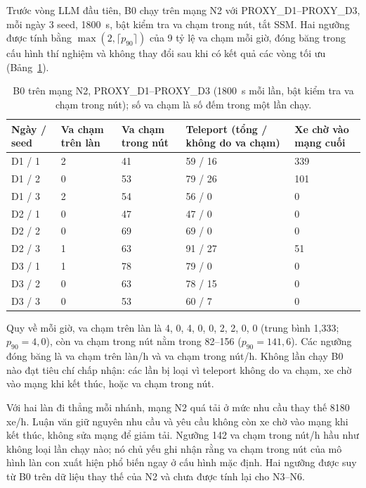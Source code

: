 \documentclass[../main.tex]{subfiles}
\begin{document}
Trước vòng LLM đầu tiên, B0 chạy trên mạng N2 với PROXY\_D1--PROXY\_D3, mỗi ngày 3 seed, 1800~s, bật kiểm tra va chạm trong nút, tắt SSM. Hai ngưỡng được tính bằng $\max(2, \lceil p_{90} \rceil)$ của 9 tỷ lệ va chạm mỗi giờ, đóng băng trong cấu hình thí nghiệm và không thay đổi sau khi có kết quả các vòng tối ưu (Bảng~\ref{table:4.r28}).

\begin{table}[!htbp]
\centering
\small
\caption{B0 trên mạng N2, PROXY\_D1--PROXY\_D3 (1800~s mỗi lần, bật kiểm tra va chạm trong nút); số va chạm là số đếm trong một lần chạy.} \label{table:4.r28}
\begin{tabular}{|p{1.6cm}|p{1.8cm}|p{2.0cm}|p{3.4cm}|p{2.2cm}|}
\hline
\textbf{Ngày / seed} & \textbf{Va chạm trên làn} & \textbf{Va chạm trong nút} & \textbf{Teleport (tổng / không do va chạm)} & \textbf{Xe chờ vào mạng cuối} \\ \hline
D1 / 1 & 2 & 41 & 59 / 16 & 339 \\ \hline
D1 / 2 & 0 & 53 & 79 / 26 & 101 \\ \hline
D1 / 3 & 2 & 54 & 56 / 0 & 0 \\ \hline
D2 / 1 & 0 & 47 & 47 / 0 & 0 \\ \hline
D2 / 2 & 0 & 69 & 69 / 0 & 0 \\ \hline
D2 / 3 & 1 & 63 & 91 / 27 & 51 \\ \hline
D3 / 1 & 1 & 78 & 79 / 0 & 0 \\ \hline
D3 / 2 & 0 & 63 & 78 / 15 & 0 \\ \hline
D3 / 3 & 0 & 53 & 60 / 7 & 0 \\ \hline
\end{tabular}
\end{table}

Quy về mỗi giờ, va chạm trên làn là 4, 0, 4, 0, 0, 2, 2, 0, 0 (trung bình 1,333; $p_{90} = 4{,}0$), còn va chạm trong nút nằm trong 82--156 ($p_{90} = 141{,}6$). Các ngưỡng đóng băng là  va chạm trên làn/h và  va chạm trong nút/h. Không lần chạy B0 nào đạt tiêu chí chấp nhận: các lần bị loại vì teleport không do va chạm, xe chờ vào mạng khi kết thúc, hoặc va chạm trong nút.

Với hai làn đi thẳng mỗi nhánh, mạng N2 quá tải ở mức nhu cầu thay thế 8180 xe/h. Luận văn giữ nguyên nhu cầu và yêu cầu không còn xe chờ vào mạng khi kết thúc, không sửa mạng để giảm tải. Ngưỡng 142 va chạm trong nút/h hầu như không loại lần chạy nào; nó chủ yếu ghi nhận rằng va chạm trong nút của mô hình làn con xuất hiện phổ biến ngay ở cấu hình mặc định. Hai ngưỡng được suy từ B0 trên dữ liệu thay thế của N2 và chưa được tính lại cho N3--N6.
\end{document}
